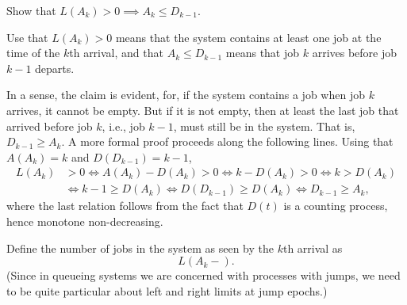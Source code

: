 \begin{extra} Show that $L(A_k)>0 \implies A_k \leq D_{k-1}$.
\begin{hint} Use that $L(A_k)>0$ means that the system contains at least one job at the time of the $k$th arrival, and that $A_k \leq D_{k-1}$ means that job $k$ arrives before job $k-1$ departs.
\end{hint}
\begin{solution} In a sense, the claim is evident, for, if the system contains a job when job $k$ arrives, it cannot be empty.
 But if it is not empty, then at least the last job that arrived before job $k$, i.e., job $k-1$, must still be in the system.
 That is, $D_{k-1} \geq A_k$.
 A more formal proof proceeds along the following lines.
 Using that $A(A_k) = k$ and $D(D_{k-1})= k-1$,
 \begin{equation*}
 \begin{split}
 L(A_k) &> 0 \Leftrightarrow A(A_k) - D(A_k) > 0 \Leftrightarrow k - D(A_k) > 0 \Leftrightarrow k > D(A_k) \\
 &\Leftrightarrow k-1 \geq D(A_k) \Leftrightarrow D(D_{k-1}) \geq D(A_k) \Leftrightarrow D_{k-1} \geq A_k, 
 \end{split}
 \end{equation*}
 where the last relation follows from the fact that $D(t)$ is a
 counting process, hence monotone non-decreasing.
\end{solution}
\end{extra}

Define the number of jobs in the system as seen by the $k$th arrival as
\begin{equation}
 \label{eq:Lk}
 L(A_k-).
\end{equation}
(Since in queueing systems we are concerned with processes with jumps, we need to be quite particular about left and right limits at jump epochs.)


